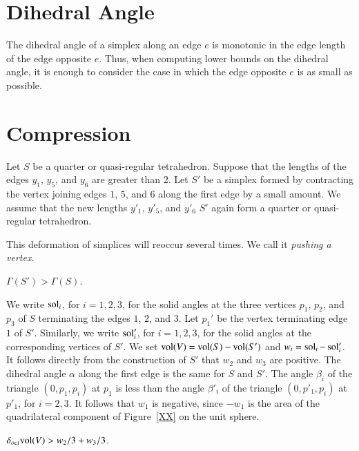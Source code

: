 \section{Dihedral Angle}\label{sec:reduction:dih}

The dihedral angle of a simplex along an edge $e$ is monotonic in
the edge length of the edge opposite $e$.  Thus, when computing
lower bounds on the dihedral angle, it is enough to consider the
case in which the edge opposite $e$ is as small as possible.

\section{Compression}\label{sec:reduction:grad}

Let $S$ be a quarter or quasi-regular tetrahedron. Suppose that
the lengths of the edges $y_1$, $y_5$, and $y_6$ are greater than
$2$. Let $S'$ be a simplex formed by contracting the vertex
joining edges $1$, $5$, and $6$ along the first edge by a small
amount. We assume that the new lengths  $y'_1$, $y'_5$, and $y'_6$
$S'$ again form a quarter or quasi-regular tetrahedron.

\begin{remark}  This deformation of simplices will reoccur several
times.  We call it {\it pushing a vertex}.
\end{remark}

\begin{lemma}  $\Gamma(S') > \Gamma(S)$.
\end{lemma}

We write $\operatorname{sol}_i$, for $i=1,2,3$, for the solid angles at the
three vertices $p_1$, $p_2$, and $p_3$ of $S$ terminating the
edges $1$, $2$, and $3$. Let $p_1'$ be the vertex terminating edge
$1$ of $S'$. Similarly, we write $\operatorname{sol}'_i$, for $i=1,2,3$, for the
solid angles at the corresponding vertices of $S'$.  We set
${\operatorname{vol}}(V) = {\operatorname{vol}}(S)-{\operatorname{vol}}(S')$ and $w_i =
\operatorname{sol}_i-\operatorname{sol}'_i$. It follows directly from the construction of $S'$
that $w_2$ and $w_3$ are positive. The dihedral angle $\alpha$
along the first edge is the same for $S$ and $S'$. The angle
$\beta_i$ of the triangle $(0,p_1,p_i)$ at $p_1$ is less than the
angle $\beta'_i$ of the triangle $(0,p'_1,p_i)$ at $p'_1$, for
$i=2,3$.  It follows that $w_1$ is negative, since $-w_1$ is the
area of the quadrilateral component of Figure~\ref{XX} on the unit
sphere.


\begin{lemma}
$\delta_{oct} {\operatorname{vol}}(V) > w_2/3 + w_3/3 $.
\end{lemma}

